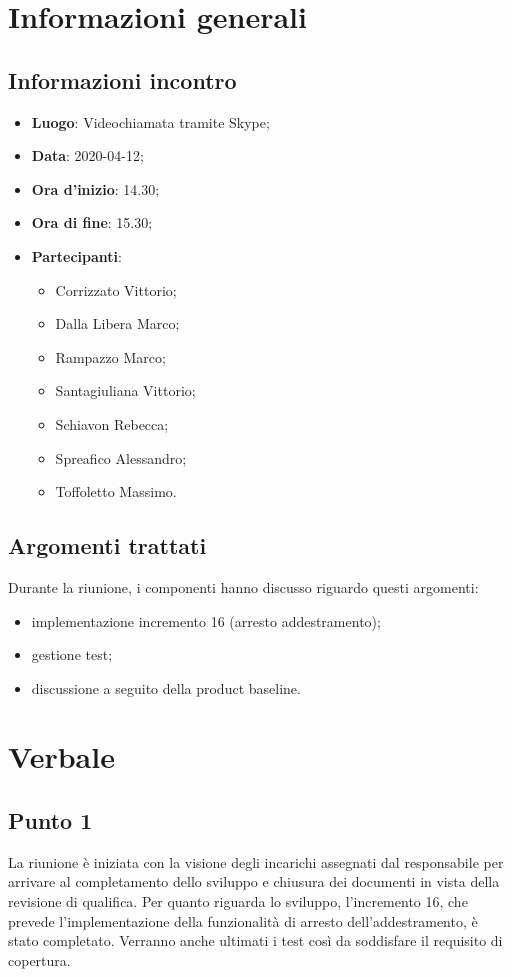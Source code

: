 \section{Informazioni generali}
    \subsection{Informazioni incontro}
        \begin{itemize}
            \item \textbf{Luogo}: Videochiamata tramite Skype;
            \item \textbf{Data}: 2020-04-12;
            \item \textbf{Ora d'inizio}: 14.30;
            \item \textbf{Ora di fine}: 15.30;
            \item \textbf{Partecipanti}: \begin{itemize}
                \item Corrizzato Vittorio;
                \item Dalla Libera Marco;
                \item Rampazzo Marco;
                \item Santagiuliana Vittorio;
                \item Schiavon Rebecca;
                \item Spreafico Alessandro;
                \item Toffoletto Massimo.
            \end{itemize}
        \end{itemize}
    \subsection{Argomenti trattati}
        Durante la riunione, i componenti hanno discusso riguardo questi argomenti:
        \begin{itemize}
            \item implementazione incremento 16 (arresto addestramento);
            \item gestione test;
            \item discussione a seguito della product baseline.
        \end{itemize}
\section{Verbale}
    \subsection{Punto 1}
        La riunione è iniziata con la visione degli incarichi assegnati dal responsabile per arrivare al completamento dello sviluppo e chiusura dei documenti in vista della revisione di qualifica. Per quanto riguarda lo sviluppo, l'incremento 16, che prevede l'implementazione della funzionalità di arresto dell'addestramento, è stato completato. Verranno anche ultimati i test così da soddisfare il requisito di copertura. 

